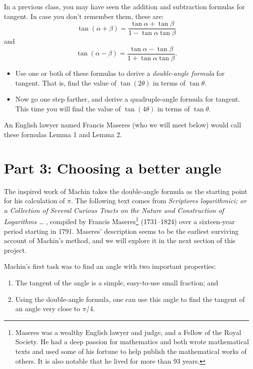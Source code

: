 \documentclass[11pt]{article}
\newcounter{tasknumb}
\newcommand{\tasknumb}{\stepcounter{tasknumb}\textmd{\textbf{$\fbox{$\fbox{Task \thetasknumb}$}$}}}
\newenvironment{task}%
 {\begin{itemize}
 \item[\tasknumb]  }
{
    \end{itemize}    }%
\begin{document}
In a previous class, you may have seen the addition and subtraction formulas for tangent.  In case you don't remember them, these are:
$$
\tan(\alpha  + \beta) = \frac{\tan \alpha + \tan \beta}{1- \tan \alpha \tan \beta}
$$
and
$$
\tan(\alpha - \beta) = \frac{\tan \alpha - \tan \beta}{1 + \tan \alpha \tan \beta}.
$$

\begin{task}
Use one or both of these formulas to derive a \emph{double-angle formula} for tangent.  That is, find the value of $\tan(2\theta)$ in terms of $\tan \theta$.
\end{task}

\begin{task}
Now go one step farther, and derive a quadruple-angle formula for tangent.  This time you will find the value of $\tan(4\theta)$ in terms of $\tan \theta$.
\end{task}

An English lawyer named Francis Maseres (who we will meet below) would call these formulas Lemma 1 and Lemma 2.

\section*{Part 3: Choosing a better angle}

The inspired work of Machin takes the double-angle formula as the starting point for his calculation of $\pi$.  The following text comes from  {\em Scriptores logarithmici; or a Collection of Several Curious Tracts on the Nature and Construction of Logarithms \ldots} \cite{maseres}, compiled by Francis Maseres\footnote{Maseres was a wealthy English lawyer and judge, and a Fellow of the Royal Society. He had a deep passion for mathematics and both wrote mathematical texts and used some of his fortune to help publish the mathematical works of others.  It is also notable that he lived for more than 93 years.}  (1731--1824)  over a sixteen-year period starting in 1791.  Maseres' description seems to be the earliest surviving account of Machin's method, and we will explore it in the next section of this project.

Machin's first task was to find an angle with two important properties:
\begin{enumerate}
\item The tangent of the angle is a simple, easy-to-use small fraction; and
\item Using the double-angle formula, one can use this angle to find  the tangent of an angle very close to $\pi/4$.
\end{enumerate}
\end{document}

